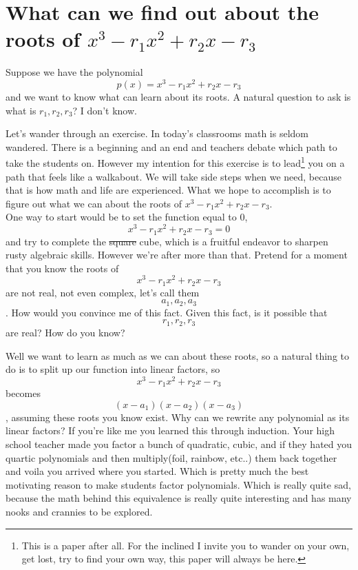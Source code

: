 \documentclass[12pt]{article}
\begin{document}




\section*{What can we find out about the roots of $x^3 -r_1 x^2 +r_2 x - r_3$}
Suppose we have the polynomial $$p(x) = x^3 -r_1 x^2 +r_2 x - r_3$$ and we want to know what can learn about its roots.  A natural question to ask is what is $r_1, r_2, r_3$?  I don't know.

Let's wander through an exercise.  In today's classrooms math is seldom wandered.  There is a beginning and an end and teachers debate which path to take the students on.  However my intention for this exercise is to lead\footnote{This is a paper after all.  For the inclined I invite you to wander on your own, get lost, try to find your own way, this paper will always be here.} you on a path that feels like a walkabout.  We will take side steps when we need, because that is how math and life are experienced.  What we hope to accomplish is to figure out what we can about the roots of $x^3 -r_1 x^2 +r_2 x - r_3$.\\

One way to start would be to set the function equal to 0,  $$x^3 -r_1 x^2 +r_2 x - r_3 =0$$ and try to complete the \sout{square} cube,  which is a fruitful endeavor to sharpen rusty algebraic skills.  However we're after more than that.  Pretend for a moment that you know the roots of  $$x^3 -r_1 x^2 +r_2 x - r_3$$ are not real, not even complex, let's call them $$a_1, a_2, a_3$$.  How would you convince me of this fact.  Given this fact, is it possible that $$r_1, r_2, r_3$$ are real?  How do you know?  

Well we want to learn as much as we can about these roots, so a natural thing to do is to split up our function into linear factors, so $$x^3 -r_1 x^2 +r_2 x - r_3$$ becomes $$(x-a_1)(x-a_2)(x-a_3)$$, assuming these roots you know exist.  Why can we rewrite any polynomial as its linear factors?  If you're like me you learned this through induction.  Your high school teacher made you factor a bunch of quadratic, cubic, and if they hated you quartic polynomials and then multiply(foil, rainbow, etc..) them back together and voila you arrived where you started.  Which is pretty much the best motivating reason to make students factor polynomials.  Which is really quite sad, because the math behind this equivalence is really quite interesting and has many nooks and crannies to be explored.
\end{document}
